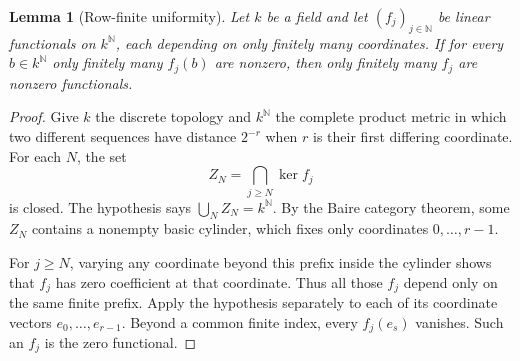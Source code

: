 \documentclass[11pt]{article}
\newtheorem{lemma}[theorem]{Lemma}
\theoremstyle{definition}
\theoremstyle{remark}
\newcommand{\N}{\mathbb N}
\numberwithin{equation}{section}
\begin{document}
\begin{lemma}[Row-finite uniformity]\label{saut:fs:lem:row-finite}
Let $k$ be a field and let $(f_j)_{j\in\N}$ be linear functionals on $k^{\N}$, each
depending on only finitely many coordinates. If for every $b\in k^{\N}$ only
finitely many $f_j(b)$ are nonzero, then only finitely many $f_j$ are nonzero
functionals.
\end{lemma}
\begin{proof}
Give $k$ the discrete topology and $k^{\N}$ the complete product metric in which two
different sequences have distance $2^{-r}$ when $r$ is their first differing
coordinate. For each $N$, the set
\[
 Z_N=\bigcap_{j\ge N}\ker f_j
\]
is closed. The hypothesis says $\bigcup_NZ_N=k^{\N}$. By the Baire category theorem,
some $Z_N$ contains a nonempty basic cylinder, which fixes only coordinates
$0,\ldots,r-1$.

For $j\ge N$, varying any coordinate beyond this prefix inside the cylinder shows
that $f_j$ has zero coefficient at that coordinate. Thus all those $f_j$ depend only
on the same finite prefix. Apply the hypothesis separately to each of its coordinate
vectors $e_0,\ldots,e_{r-1}$. Beyond a common finite index, every $f_j(e_s)$
vanishes. Such an $f_j$ is the zero functional.
\end{proof}
\end{document}
